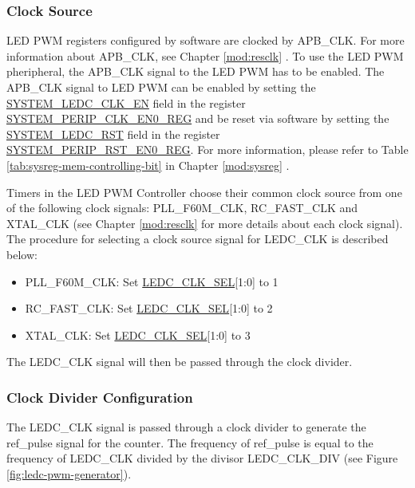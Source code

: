 \documentclass[main\_\_EN.tex]{subfiles}
\begin{document}
\subsubsection{Clock Source}
LED PWM registers configured by software are clocked by APB\_CLK. For more information about APB\_CLK, see Chapter \ref{mod:resclk} \textit{}. To use the LED PWM pheripheral, the APB\_CLK signal to the LED PWM has to be enabled. The APB\_CLK signal to LED PWM can be enabled by setting the  \hyperref[fielddesc:SYSTEMLEDCCLKEN]{SYSTEM\_LEDC\_CLK\_EN} field in the register \hyperref[regdesc:SYSTEMPERIPCLKEN0REG]{SYSTEM\_PERIP\_CLK\_EN0\_REG} and be reset via software by setting the \hyperref[fielddesc:SYSTEMLEDCRST]{SYSTEM\_LEDC\_RST} field in the register \hyperref[regdesc:SYSTEMPERIPRSTEN0REG]{SYSTEM\_PERIP\_RST\_EN0\_REG}. For more information, please refer to Table \ref{tab:sysreg-mem-controlling-bit} in Chapter \ref{mod:sysreg} \textit{}. 

Timers in the LED PWM Controller choose their common clock source from one of the following clock signals: PLL\_F60M\_CLK, RC\_FAST\_CLK and XTAL\_CLK (see Chapter \ref{mod:resclk} \textit{} for more details about each clock signal). The procedure for selecting a clock source signal for LEDC\_CLK is described below:

\begin{itemize}
    \item PLL\_F60M\_CLK: Set \hyperref[fielddesc:LEDCCLKSEL]{LEDC\_CLK\_SEL}[1:0] to 1 
    \item RC\_FAST\_CLK: Set \hyperref[fielddesc:LEDCCLKSEL]{LEDC\_CLK\_SEL}[1:0] to 2 
    \item XTAL\_CLK: Set \hyperref[fielddesc:LEDCCLKSEL]{LEDC\_CLK\_SEL}[1:0] to 3 

\end{itemize}

The LEDC\_CLK signal will then be passed through the clock divider.

\subsubsection{Clock Divider Configuration}

The LEDC\_CLK signal is passed through a clock divider to generate the ref\_pulse signal for the counter. The frequency of ref\_pulse is equal to the frequency of LEDC\_CLK divided by the divisor LEDC\_CLK\_DIV (see Figure \ref{fig:ledc-pwm-generator}).
\end{document}
